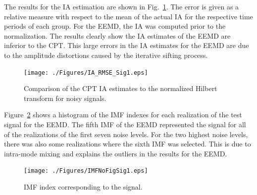 \documentclass[a4paper]{IEEEtran}
\newcommand{\todo}[1]{\textsf{\emph{\textbf{\textcolor{blue}{#1}}}}}
\begin{document}
The results for the IA estimation are shown in Fig.~\ref{fig:RMSEComparisonSig1_IA}. The error is given as a relative measure with respect to the mean of the actual IA for the respective time periods of each group. For the EEMD, the IA was computed prior to the normalization. The results clearly show the IA estimates of the EEMD are inferior to the CPT. This large errors in the IA estimates for the EEMD are due to the amplitude distortions caused by the iterative sifting process.  
\begin{figure}[!ht]\label{fig:RMSEComparisonSig1_IA}
    \centering
        \texttt{[image: ./Figures/IA\_RMSE\_Sig1.eps]}
    \caption{Comparison of the CPT IA estimates to the normalized Hilbert transform for noisy signals.}
\end{figure}
Figure~\ref{fig:IMFNoNHT} shows a histogram of the IMF indexes for each realization of the test signal for the EEMD. The fifth IMF of the EEMD represented the signal for all of the realizations of the first seven noise levels. For the two highest noise levels, there was also some realizations where the sixth IMF was selected. This is due to intra-mode mixing and explains the outliers in the results for the EEMD.   
\begin{figure}[!ht]\label{fig:IMFNoNHT}
    \centering
        \texttt{[image: ./Figures/IMFNoFigSig1.eps]}
    \caption{IMF index corresponding to the signal.}
\end{figure}


\end{document}
